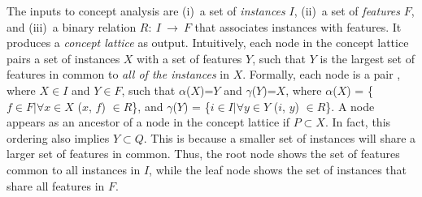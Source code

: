 The inputs to concept analysis are (i)~a set of \textit{instances} $I$, (ii)~a
set of \textit{features} $F$, and (iii)~a binary relation $R:~I~\rightarrow~F$
that associates instances with features. It produces a \textit{concept lattice}
as output.  Intuitively, each node in the concept lattice pairs a set of
instances $X$ with a set of features $Y$, such that $Y$ is the largest set of
features in common to \textit{all of the instances} in $X$.  Formally, each
node is a pair , where $X \in I$ and $Y \in F$, such that
$\alpha$($X$)=$Y$ and $\gamma$($Y$)=$X$, where $\alpha$($X$) = \{$f \in
F|\forall x\in X$ ($x$, $f$) $\in R$\}, and $\gamma$($Y$) = \{$i \in I|\forall
y\in Y$ ($i$, $y$) $\in R$\}.  A node  appears as an ancestor of
a node  in the concept lattice if $P \subset X$.  In fact, this
ordering also implies $Y \subset Q$. This is because a smaller set of instances
will share a larger set of features in common. Thus, the root node shows the
set of features common to all instances in $I$, while the leaf node shows the
set of instances that share all features in $F$.

